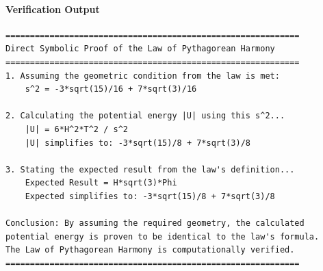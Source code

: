 \paragraph{Verification Output}
\begin{verbatim}
============================================================
Direct Symbolic Proof of the Law of Pythagorean Harmony
============================================================
1. Assuming the geometric condition from the law is met:
    s^2 = -3*sqrt(15)/16 + 7*sqrt(3)/16

2. Calculating the potential energy |U| using this s^2...
    |U| = 6*H^2*T^2 / s^2
    |U| simplifies to: -3*sqrt(15)/8 + 7*sqrt(3)/8

3. Stating the expected result from the law's definition...
    Expected Result = H*sqrt(3)*Phi
    Expected simplifies to: -3*sqrt(15)/8 + 7*sqrt(3)/8

Conclusion: By assuming the required geometry, the calculated
potential energy is proven to be identical to the law's formula.
The Law of Pythagorean Harmony is computationally verified.
============================================================
\end{verbatim}